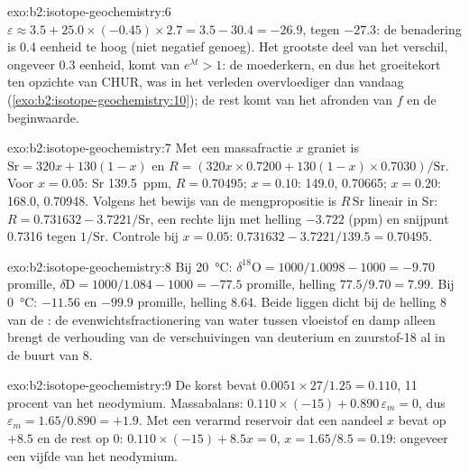 \begin{solution}{exo:b2:isotope-geochemistry:6}
$\varepsilon \approx 3.5 + 25.0\times(-0.45)\times2.7 = 3.5 - 30.4 = -26.9$, tegen
$-27.3$: de benadering is 0.4 eenheid te hoog (niet negatief genoeg). Het grootste deel van het
verschil, ongeveer 0.3 eenheid, komt van $e^{\lambda t} > 1$: de moederkern, en dus het
groeitekort ten opzichte van CHUR, was in het verleden overvloediger dan vandaag
(\cref{exo:b2:isotope-geochemistry:10}); de rest komt van het afronden van $f$ en de beginwaarde.
\end{solution}

\begin{solution}{exo:b2:isotope-geochemistry:7}
Met een massafractie $x$ graniet is $\mathrm{Sr} = 320x + 130(1-x)$ en
$R = (320x\times0.7200 + 130(1-x)\times0.7030)/\mathrm{Sr}$. Voor $x = 0.05$: Sr
\qty{139.5}{ppm}, $R = 0.70495$; $x = 0.10$: 149.0, 0.70665; $x = 0.20$: 168.0,
0.70948. Volgens het bewijs van de mengpropositie is $R\,\mathrm{Sr}$ lineair in Sr:
$R = 0.731632 - 3.7221/\mathrm{Sr}$, een rechte lijn met helling $-3.722$ (ppm) en
snijpunt 0.7316 tegen $1/\mathrm{Sr}$. Controle bij $x = 0.05$: $0.731632 - 3.7221/139.5
= 0.70495$.
\end{solution}

\begin{solution}{exo:b2:isotope-geochemistry:8}
Bij \qty{20}{\degreeCelsius}: $\delta^{18}\mathrm{O} = 1000/1.0098 - 1000 = -9.70$
promille, $\delta\mathrm{D} = 1000/1.084 - 1000 = -77.5$ promille, helling $77.5/9.70 = 7.99$.
Bij \qty{0}{\degreeCelsius}: $-11.56$ en $-99.9$ promille, helling 8.64. Beide liggen dicht bij
de helling 8 van de : de evenwichtsfractionering van water
tussen vloeistof en damp alleen brengt de verhouding van de verschuivingen van deuterium en zuurstof-18
al in de buurt van 8.
\end{solution}

\begin{solution}{exo:b2:isotope-geochemistry:9}
De korst bevat $0.0051\times27/1.25 = 0.110$, 11 procent van het neodymium.
Massabalans: $0.110\times(-15) + 0.890\,\varepsilon_m = 0$, dus $\varepsilon_m = 1.65/0.890 =
+1.9$. Met een verarmd reservoir dat een aandeel $x$ bevat op $+8.5$ en de rest op 0:
$0.110\times(-15) + 8.5x = 0$, $x = 1.65/8.5 = 0.19$: ongeveer een vijfde van het
neodymium.
\end{solution}

